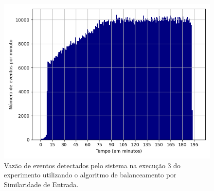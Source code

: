 


\begin{figure}[h]
\centering
\includegraphics[width=\textwidth]{figuras/graphics/histogram_vazao_8-dez-is.png}
\caption{Vazão de eventos detectados pelo sistema na execução 3 do experimento utilizando o algoritmo de balanceamento por Similaridade de Entrada.}
\label{fig:vazao_8-dez-is}
\end{figure}



